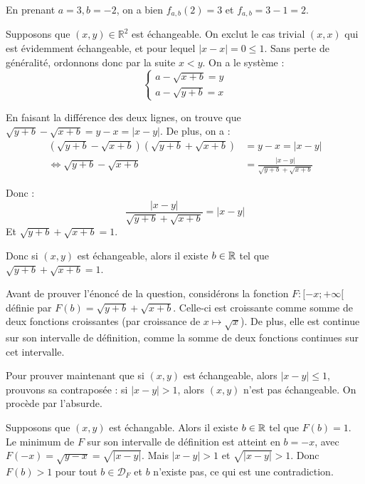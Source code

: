 \documentclass[]{../../homework}
\begin{document}
	\subproblem
	En prenant $a = 3, b=-2$, on a bien $f_{a,b}(2) = 3$ et $f_{a,b} = 3-1 = 2$.
	\subproblem
	
	Supposons que $(x,y) \in \mathbb R^2$ est échangeable. On exclut le cas trivial $(x,x)$ qui est évidemment échangeable, et pour lequel $|x-x| = 0 \leq 1$. Sans perte de généralité, ordonnons donc par la suite $x < y$. On a le système :
	\begin{equation*}
		\begin{cases}
			a - \sqrt{x+b} = y \\
			a - \sqrt{y+b} = x
		\end{cases}
	\end{equation*}
	
	En faisant la différence des deux lignes, on trouve que $\sqrt{y+b} - \sqrt{x+b} = y-x = |x-y|$. De plus, on a :
	\begin{equation*}
		\begin{split}
		(\sqrt{y+b} - \sqrt{x+b})(\sqrt{y+b} + \sqrt{x+b}) &=y-x = |x-y| \\
		 \iff \sqrt{y+b} - \sqrt{x+b} &= \frac {|x-y|}{\sqrt{y+b} + \sqrt{x+b}} 
		 \end{split}
	\end{equation*}
	
	Donc : $$\frac {|x-y|}{\sqrt{y+b} + \sqrt{x+b}} = |x-y|$$
	Et $\sqrt{y+b} + \sqrt{x+b} = 1$.
	
	Donc si $(x,y)$ est échangeable, alors il existe $b\in\mathbb R$ tel que $\sqrt{y+b} + \sqrt{x+b} = 1$.
	
	Avant de prouver l'énoncé de la question, considérons la fonction $F: [-x;+\infty[$ définie par $F(b) = \sqrt{y+b} + \sqrt{x+b}$. Celle-ci est croissante comme somme de deux fonctions croissantes (par croissance de $x\mapsto \sqrt x$). De plus, elle est continue sur son intervalle de définition, comme la somme de deux fonctions continues sur cet intervalle.

	Pour prouver maintenant que si $(x,y)$ est échangeable, alors $|x-y| \leq 1$, prouvons sa contraposée : si $|x-y| > 1$, alors $(x,y)$ n'est pas échangeable. On procède par l'absurde.
	
	Supposons que $(x,y)$ est échangable. Alors il existe $b\in\mathbb R$ tel que $F(b) = 1$. Le minimum de $F$ sur son intervalle de définition est atteint en $b=-x$, avec $F(-x) = \sqrt{y-x} = \sqrt{|x-y|}$. Mais $|x-y| > 1$ et $\sqrt{|x-y|} > 1$. Donc $F(b) > 1$ pour tout $b\in \mathcal D_F$ et $b$ n'existe pas, ce qui est une contradiction.
	
\end{document}
